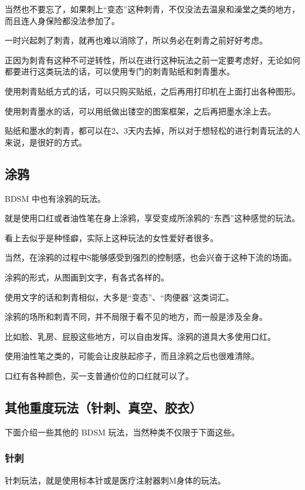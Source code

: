 \documentclass[12pt,UTF8]{ctexbook}
\begin{document}
当然也不要忘了，如果刺上“变态”这种刺青，不仅没法去温泉和澡堂之类的地方，而且连人身保险都没法参加了。

一时兴起刺了刺青，就再也难以消除了，所以务必在刺青之前好好考虑。

正因为刺青有这种不可逆转性，所以在进行这种玩法之前一定要考虑好，无论如何都要进行这类玩法的话，可以使用专门的刺青贴纸和刺青墨水。

使用刺青贴纸方式的话，可以只购买贴纸，之后再用打印机在上面打出各种图形。

使用刺青墨水的话，可以用纸做出镂空的图案框架，之后再把墨水涂上去。

贴纸和墨水的刺青，都可以在2、3天内去掉，所以对于想轻松的进行刺青玩法的人来说，是很好的方式。

\subsection{涂鸦}

BDSM 中也有涂鸦的玩法。

就是使用口红或者油性笔在身上涂鸦，享受变成所涂鸦的“东西”这种感觉的玩法。

看上去似乎是种怪癖，实际上这种玩法的女性爱好者很多。

当然，在涂鸦的过程中S能够感受到强烈的控制感，也会兴奋于这种下流的场面。

涂鸦的形式，从图画到文字，有各式各样的。

使用文字的话和刺青相似，大多是“变态”、“肉便器”这类词汇。

涂鸦的场所和刺青不同，并不局限于看不见的地方，而一般是涉及全身。

比如脸、乳房、屁股这些地方，可以自由发挥。涂鸦的道具大多使用口红。

使用油性笔之类的，可能会让皮肤起疹子，而且涂鸦之后也很难清除。

口红有各种颜色，买一支普通价位的口红就可以了。

\subsection{其他重度玩法（针刺、真空、胶衣）}

下面介绍一些其他的 BDSM 玩法，当然种类不仅限于下面这些。 

\subsubsection{针刺}

针刺玩法，就是使用标本针或是医疗注射器刺M身体的玩法。
\end{document}
